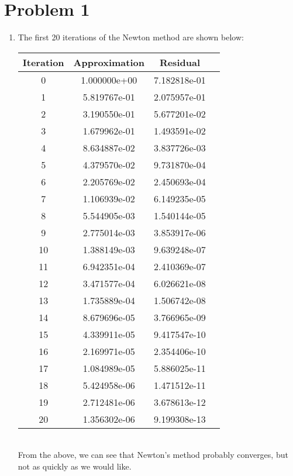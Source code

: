 \documentclass{article}
\title{\thetitle}
\author{\theauthor}
\begin{document}
\maketitle
\section*{Problem 1}
\begin{enumerate}[label=\alph*.)]
\item The first 20 iterations of the Newton method are shown below: \\
\begin{tabular}{|c|c|c|c|}
\hline
Iteration & Approximation & Residual\\
\hline
0 & 1.000000e+00 & 7.182818e-01\\
\hline
1 & 5.819767e-01 & 2.075957e-01\\
\hline
2 & 3.190550e-01 & 5.677201e-02\\
\hline
3 & 1.679962e-01 & 1.493591e-02\\
\hline
4 & 8.634887e-02 & 3.837726e-03\\
\hline
5 & 4.379570e-02 & 9.731870e-04\\
\hline
6 & 2.205769e-02 & 2.450693e-04\\
\hline
7 & 1.106939e-02 & 6.149235e-05\\
\hline
8 & 5.544905e-03 & 1.540144e-05\\
\hline
9 & 2.775014e-03 & 3.853917e-06\\
\hline
10 & 1.388149e-03 & 9.639248e-07\\
\hline
11 & 6.942351e-04 & 2.410369e-07\\
\hline
12 & 3.471577e-04 & 6.026621e-08\\
\hline
13 & 1.735889e-04 & 1.506742e-08\\
\hline
14 & 8.679696e-05 & 3.766965e-09\\
\hline
15 & 4.339911e-05 & 9.417547e-10\\
\hline
16 & 2.169971e-05 & 2.354406e-10\\
\hline
17 & 1.084989e-05 & 5.886025e-11\\
\hline
18 & 5.424958e-06 & 1.471512e-11\\
\hline
19 & 2.712481e-06 & 3.678613e-12\\
\hline
20 & 1.356302e-06 & 9.199308e-13\\
\hline
\end{tabular} \\ 
From the above, we can see that Newton's method probably converges, but not as quickly as we would like. \\

\end{enumerate}
\end{document}
